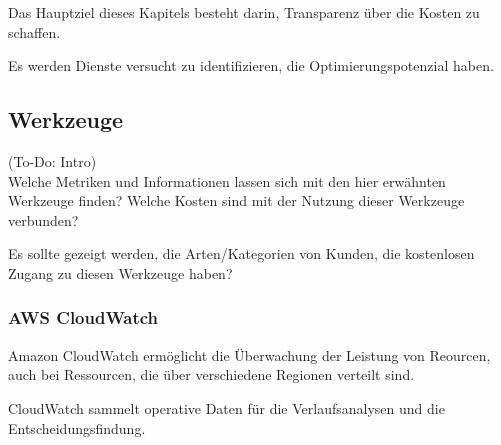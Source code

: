 Das Hauptziel dieses Kapitels besteht darin, Transparenz über die Kosten zu schaffen.

Es werden Dienste versucht zu identifizieren, die Optimierungspotenzial haben. 
\\
\subsection{Werkzeuge}
(To-Do: Intro)\\


Welche Metriken und Informationen lassen sich mit den hier erwähnten Werkzeuge finden?
Welche Kosten sind mit der Nutzung dieser Werkzeuge verbunden?


Es sollte gezeigt werden, die Arten/Kategorien von Kunden, die kostenlosen Zugang zu diesen Werkzeuge haben?


\subsubsection{AWS CloudWatch}

Amazon CloudWatch ermöglicht die Überwachung der Leistung von Reourcen, auch bei Ressourcen, die über verschiedene Regionen verteilt sind. 


CloudWatch sammelt operative Daten für die Verlaufsanalysen und die Entscheidungsfindung.

